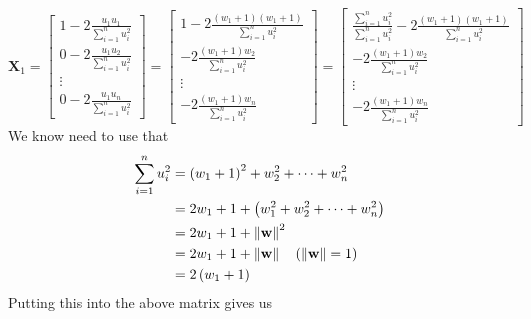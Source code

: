 \documentclass{article}
\begin{document}
\begin{equation*}
    \mathbf{X}_{1} =\begin{bmatrix}
     1 - 2 \frac{u_{1}u_{1}}{\sum_{i=1}^{n}u_{i}^{2}} \\
     0 - 2 \frac{u_{1}u_{2}}{\sum_{i=1}^{n}u_{i}^{2}} \\
     \vdots \\
     0 - 2 \frac{u_{1}u_{n}}{\sum_{i=1}^{n}u_{i}^{2}}
   \end{bmatrix}
   = 
   \begin{bmatrix}
      1- 2\frac{\left(w_{1} + 1\right)\left(w_{1} + 1\right)}{\sum_{i=1}^{n}u_{i}^{2}} \\[1mm]
      - 2\frac{\left(w_{1} + 1\right)w_{2}}{\sum_{i=1}^{n}u_{i}^{2}} \\[1mm]
      \vdots \\
      - 2\frac{\left(w_{1} + 1\right)w_{n}}{\sum_{i=1}^{n}u_{i}^{2}}
   \end{bmatrix} =
   \begin{bmatrix}
      \frac{\sum_{i=1}^{n}u_{i}^{2}}{\sum_{i=1}^{n}u_{i}^{2}}- 2\frac{\left(w_{1} + 1\right)\left(w_{1} + 1\right)}{\sum_{i=1}^{n}u_{i}^{2}} \\[1mm]
      - 2\frac{\left(w_{1} + 1\right)w_{2}}{\sum_{i=1}^{n}u_{i}^{2}} \\[1mm]
      \vdots \\
      - 2\frac{\left(w_{1} + 1\right)w_{n}}{\sum_{i=1}^{n}u_{i}^{2}}
   \end{bmatrix}
\end{equation*}
We know need to use that
\begin{align*}
    \sum_{i=1}^{n}u_{i}^{2} &= \left(w_{1} + 1\right)^{2} + w_{2}^{2} + \dots + w_{n}^{2} 
 \\
 &= 2w_{1} + 1 + \left(w_{1}^{2}+ w_{2}^{2} + \dots + w_{n}^{2}\right) \\
 &= 2w_{1} + 1 + \left\lVert \mathbf{w}\right\rVert^{2} \\
 &= 2w_{1} + 1 + \left\lVert \mathbf{w}\right\rVert \quad \text{($ \left\lVert \mathbf{w}\right\rVert = 1$)}  \\
 &= 2\left(w_{1} + 1\right)
\end{align*}
Putting this into the above matrix gives us
\end{document}
